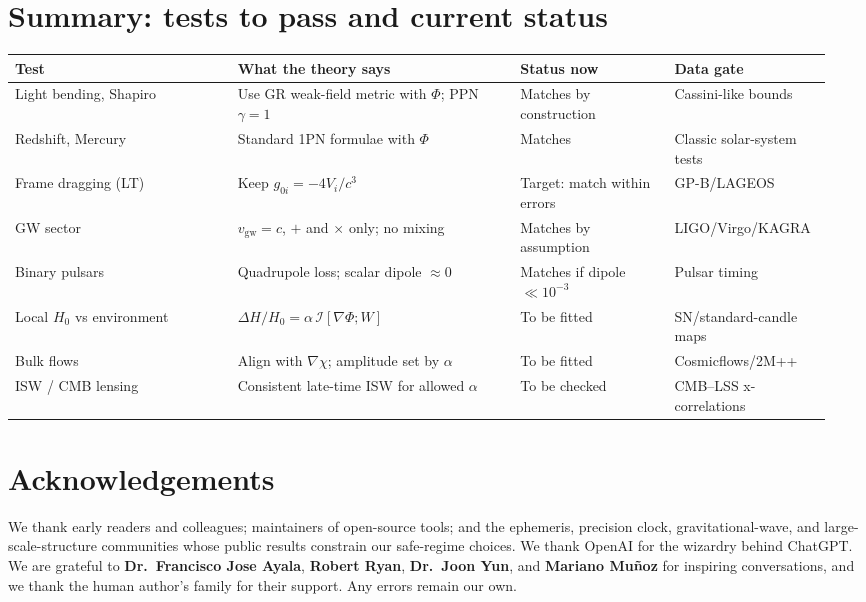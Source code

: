 \documentclass[11pt]{article}
\begin{document}
\section*{Summary: tests to pass and current status}
\begin{center}
\begin{tabular}{|p{0.26\linewidth}|p{0.33\linewidth}|p{0.18\linewidth}|p{0.18\linewidth}|}
\hline
\textbf{Test} & \textbf{What the theory says} & \textbf{Status now} & \textbf{Data gate}\\\hline
Light bending, Shapiro & Use GR weak-field metric with $\Phi$; PPN $\gamma=1$ & Matches by construction & Cassini-like bounds \\\hline
Redshift, Mercury & Standard 1PN formulae with $\Phi$ & Matches & Classic solar-system tests \\\hline
Frame dragging (LT) & Keep $g_{0i}=-4V_i/c^3$ & Target: match within errors & GP-B/LAGEOS \\\hline
GW sector & $v_{\mathrm{gw}}=c$, $+$ and $\times$ only; no mixing & Matches by assumption & LIGO/Virgo/KAGRA \\\hline
Binary pulsars & Quadrupole loss; scalar dipole $\approx 0$ & Matches if dipole $\ll 10^{-3}$ & Pulsar timing \\\hline
Local $H_0$ vs environment & $\Delta H/H_0 = \alpha \,\mathcal{I}[\nabla\Phi;W]$ & To be fitted & SN/standard-candle maps \\\hline
Bulk flows & Align with $\nabla\chi$; amplitude set by $\alpha$ & To be fitted & Cosmicflows/2M++ \\\hline
ISW / CMB lensing & Consistent late-time ISW for allowed $\alpha$ & To be checked & CMB–LSS x-correlations \\\hline
\end{tabular}
\end{center}

\section*{Acknowledgements}
We thank early readers and colleagues; maintainers of open-source tools; and the ephemeris, precision clock, gravitational-wave, and large-scale-structure communities whose public results constrain our safe-regime choices. We thank OpenAI for the wizardry behind ChatGPT. We are grateful to \textbf{Dr.\ Francisco Jose Ayala}, \textbf{Robert Ryan}, \textbf{Dr.\ Joon Yun}, and \textbf{Mariano Mu\~noz} for inspiring conversations, and we thank the human author's family for their support. Any errors remain our own.
\end{document}

